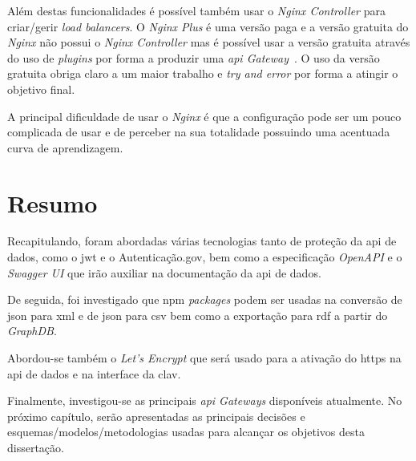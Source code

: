 Além destas funcionalidades é possível também usar o \textit{Nginx Controller} para criar/gerir \textit{load balancers}. O \textit{Nginx Plus} é uma versão paga e a versão gratuita do \textit{Nginx} não possui o \textit{Nginx Controller} mas é possível usar a versão gratuita através do uso de \textit{plugins} por forma a produzir uma \textit{\acrshort{api} Gateway}~\cite{compAPIGat}. O uso da versão gratuita obriga claro a um maior trabalho e \textit{try and error} por forma a atingir o objetivo final.

A principal dificuldade de usar o \textit{Nginx} é que a configuração pode ser um pouco complicada de usar e de perceber na sua totalidade possuindo uma acentuada curva de aprendizagem.

\section{Resumo}

Recapitulando, foram abordadas várias tecnologias tanto de proteção da \acrshort{api} de dados, como o \acrshort{jwt} e o Autenticação.gov, bem como a especificação \textit{OpenAPI} e o \textit{Swagger UI} que irão auxiliar na documentação da \acrshort{api} de dados.

De seguida, foi investigado que \acrshort{npm} \textit{packages} podem ser usadas na conversão de \acrshort{json} para \acrshort{xml} e de \acrshort{json} para \acrshort{csv} bem como a exportação para \acrshort{rdf} a partir do \textit{GraphDB}.

Abordou-se também o \textit{Let's Encrypt} que será usado para a ativação do \acrshort{https} na \acrshort{api} de dados e na interface da \acrshort{clav}.

Finalmente, investigou-se as principais \textit{\acrshort{api} Gateways} disponíveis atualmente. No próximo capítulo, serão apresentadas as principais decisões e esquemas/modelos/metodologias usadas para alcançar os objetivos desta dissertação.
